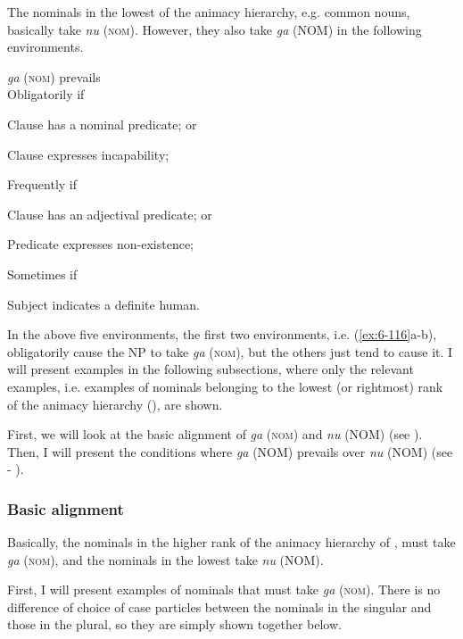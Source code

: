 \begin{table}
The nominals in the lowest of the animacy hierarchy, e.g. common nouns, basically take \textit{nu} (\textsc{nom}). However, they also take \textit{ga} (NOM) in the following environments.

\ea\label{ex:6-116}
 \textit{ga} (\textsc{nom}) prevails\\

  Obligatorily if

 \ea Clause has a nominal predicate; or\\
\gll

\ex Clause expresses incapability;\\
\gll

  Frequently if

\ex Clause has an adjectival predicate; or\\
\gll

\ex Predicate expresses non-existence;\\
\gll

  Sometimes if

\ex Subject indicates a definite human.\\
\gll

In the above five environments, the first two environments, i.e. (\ref{ex:6-116}a-b), obligatorily cause the NP to take \textit{ga} (\textsc{nom}), but the others just tend to cause it. I will present examples in the following subsections, where only the relevant examples, i.e. examples of nominals belonging to the lowest (or rightmost) rank of the animacy hierarchy (), are shown.

  First, we will look at the basic alignment of \textit{ga} (\textsc{nom}) and \textit{nu} (NOM) (see ). Then, I will present the conditions where \textit{ga} (NOM) prevails over \textit{nu} (NOM) (see  - ).

\subsubsection{Basic alignment}

Basically, the nominals in the higher rank of the animacy hierarchy of , must take \textit{ga} (\textsc{nom}), and the nominals in the lowest take \textit{nu} (NOM).

First, I will present examples of nominals that must take \textit{ga} (\textsc{nom}). There is no difference of choice of case particles between the nominals in the singular and those in the plural, so they are simply shown together below.


\end{table}
